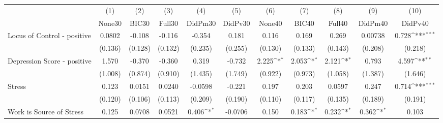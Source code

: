 {
\def\sym#1{\ifmmode^{#1}\else\(^{#1}\)\fi}
\begin{tabular}{l*{10}{c}}
\toprule
            &\multicolumn{1}{c}{(1)}&\multicolumn{1}{c}{(2)}&\multicolumn{1}{c}{(3)}&\multicolumn{1}{c}{(4)}&\multicolumn{1}{c}{(5)}&\multicolumn{1}{c}{(6)}&\multicolumn{1}{c}{(7)}&\multicolumn{1}{c}{(8)}&\multicolumn{1}{c}{(9)}&\multicolumn{1}{c}{(10)}\\
            &\multicolumn{1}{c}{None30}&\multicolumn{1}{c}{BIC30}&\multicolumn{1}{c}{Full30}&\multicolumn{1}{c}{DidPm30}&\multicolumn{1}{c}{DidPv30}&\multicolumn{1}{c}{None40}&\multicolumn{1}{c}{BIC40}&\multicolumn{1}{c}{Full40}&\multicolumn{1}{c}{DidPm40}&\multicolumn{1}{c}{DidPv40}\\
\midrule
Locus of Control - positive&      0.0802         &      -0.108         &      -0.116         &      -0.354         &       0.181         &       0.116         &       0.169         &       0.269         &     0.00738         &       0.728\sym{***}\\
            &     (0.136)         &     (0.128)         &     (0.132)         &     (0.235)         &     (0.255)         &     (0.130)         &     (0.133)         &     (0.143)         &     (0.208)         &     (0.218)         \\
\addlinespace
Depression Score - positive&       1.570         &      -0.370         &      -0.360         &       0.319         &      -0.732         &       2.225\sym{*}  &       2.053\sym{*}  &       2.121\sym{*}  &       0.793         &       4.597\sym{**} \\
            &     (1.008)         &     (0.874)         &     (0.910)         &     (1.435)         &     (1.749)         &     (0.922)         &     (0.973)         &     (1.058)         &     (1.387)         &     (1.646)         \\
\addlinespace
Stress      &       0.123         &      0.0151         &      0.0240         &     -0.0598         &      -0.221         &       0.197         &       0.203         &      0.0597         &       0.247         &       0.714\sym{***}\\
            &     (0.120)         &     (0.106)         &     (0.113)         &     (0.209)         &     (0.190)         &     (0.110)         &     (0.117)         &     (0.135)         &     (0.189)         &     (0.191)         \\
\addlinespace
Work is Source of Stress&       0.125         &      0.0708         &      0.0521         &       0.406\sym{*}  &     -0.0706         &       0.150         &       0.183\sym{*}  &       0.232\sym{*}  &       0.362\sym{*}  &       0.103         \\

\end{tabular}}
